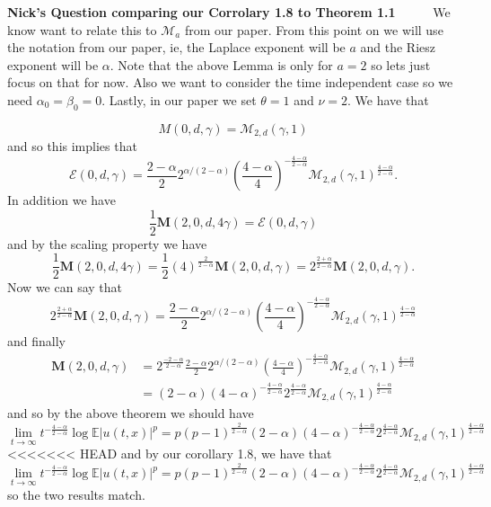 \documentclass[a4paper,11pt]{article}
\numberwithin{equation}{section}
\theoremstyle{plain}
\theoremstyle{definition}
\newcounter{NQ}
\newenvironment{NickQuestion}[1][] %
{\refstepcounter{NQ}
	\begin{mdframed}[backgroundcolor=lightgray]\textbf{Nick's Question \theNQ \: #1~~}~~~\noindent}%
	{\end{mdframed}}
\numberwithin{NQ}{section}
\numberwithin{LQ}{section}
\numberwithin{ZQ}{section}
\begin{document}
\begin{NickQuestion}[comparing our Corrolary 1.8 to \cite{CHSS18} Theorem 1.1]
We know want to relate this to $\mathcal{M}_a$ from our paper.  From this point on we will use the notation from our paper, ie, the Laplace exponent will be $a$ and the Riesz exponent will be $\alpha$. Note that the above Lemma is only for $a=2$ so lets just focus on that for now. Also we want to consider the time independent case so we need $\alpha_0=\beta_0=0$. Lastly, in our paper we set $\theta=1$ and $\nu = 2$. We have that

	\[
		M(0,d,\gamma) = \mathcal{M}_{2,d}(\gamma,1)
	\]
and so this implies that
\[
\mathcal{E}(0,d,\gamma) = \frac{2-\alpha}{2}2^{\alpha/(2-\alpha)}\left( \frac{4-\alpha}{4} \right)^{-\frac{4-\alpha}{2-\alpha}}\mathcal{M}_{2,d}(\gamma,1)^{\frac{4-\alpha}{2-\alpha}}.
\]
In addition we have
	\[
		\frac{1}{2}\textbf{M}(2,0,d,4\gamma) = \mathcal{E}(0,d,\gamma)
	\]
and by the scaling property we have
	\[
			\frac{1}{2}\textbf{M}(2,0,d,4\gamma) = \frac{1}{2}(4)^{\frac{2}{2-\alpha}}\textbf{M}(2,0,d,\gamma) = 2^{\frac{2+\alpha}{2-\alpha}}\textbf{M}(2,0,d,\gamma).
	\]
Now we can say that
	\[
		2^{\frac{2+\alpha}{2-\alpha}}\textbf{M}(2,0,d,\gamma) = \frac{2-\alpha}{2}2^{\alpha/(2-\alpha)}\left( \frac{4-\alpha}{4} \right)^{-\frac{4-\alpha}{2-\alpha}}\mathcal{M}_{2,d}(\gamma,1)^{\frac{4-\alpha}{2-\alpha}}
	\]
and finally
	\begin{align*}
		\textbf{M}(2,0,d,\gamma) &=2^{\frac{-2-\alpha}{2-\alpha}} \frac{2-\alpha}{2}2^{\alpha/(2-\alpha)}\left( \frac{4-\alpha}{4} \right)^{-\frac{4-\alpha}{2-\alpha}}\mathcal{M}_{2,d}(\gamma,1)^{\frac{4-\alpha}{2-\alpha}}
		\\&= (2-\alpha)(4-\alpha)^{-\frac{4-\alpha}{2-\alpha}}2^{\frac{4-\alpha}{2-\alpha}}\mathcal{M}_{2,d}(\gamma,1)^{\frac{4-\alpha}{2-\alpha}}
	\end{align*}
and so by the above theorem we should have
	\[
		\lim_{t\to \infty} t^{-\frac{4-\alpha}{2-\alpha}}\log \mathbb{E}|u(t,x)|^p = p(p-1)^{\frac{2}{2-\alpha}}(2-\alpha)(4-\alpha)^{-\frac{4-\alpha}{2-\alpha}}2^{\frac{4-\alpha}{2-\alpha}}\mathcal{M}_{2,d}(\gamma,1)^{\frac{4-\alpha}{2-\alpha}}
	\]
<<<<<<< HEAD
and by our corollary 1.8, we have that
	\[
			\lim_{t\to \infty}t^{-\frac{4-\alpha}{2-\alpha}}\log \mathbb{E}|u(t,x)|^p =p(p-1)^{\frac{2}{2-\alpha}} (2-\alpha)(4-\alpha)^{-\frac{4-\alpha}{2-\alpha}}2^{\frac{4-\alpha}{2-\alpha}}\mathcal{M}_{2,d}(\gamma,1)^{\frac{4-\alpha}{2-\alpha}}
	\]
so the two results match.
	\end{NickQuestion}
\end{document}
